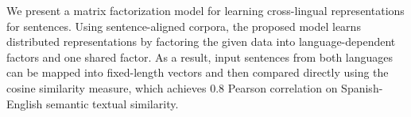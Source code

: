 We present a matrix factorization model for learning cross-lingual representations for sentences. Using sentence-aligned corpora, the proposed model learns distributed representations by factoring the given data into language-dependent factors and one shared factor. As a result, input sentences from both languages can be mapped into fixed-length vectors and then compared directly using the cosine similarity measure, which achieves 0.8 Pearson correlation on Spanish-English semantic textual similarity.
